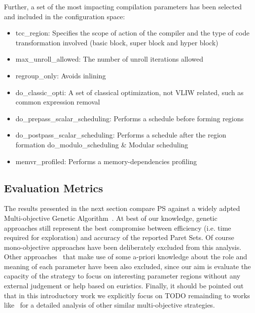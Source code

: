 \begin{itemize}
Further, a set of the most impacting compilation parameters has been
selected and included in the configuration space:
\begin{itemize}
\item{tcc\_region}: Specifies the scope of action of the compiler and the type
of code transformation involved (basic block, super block and hyper
block) 
\item {max\_unroll\_allowed}: The number of unroll iterations allowed
\item{regroup\_only}: Avoids inlining 
\item{do\_classic\_opti}: A set of classical optimization, not VLIW related,
such as common expression removal 
\item{do\_prepass\_scalar\_scheduling}: Performs a schedule before
forming regions 
\item{do\_postpass\_scalar\_scheduling}: Performs a schedule after the region formation 
do\_modulo\_scheduling & Modular scheduling 
\item{memvr\_profiled}: Performs a memory-dependencies profiling 
\end{itemize}

\subsection{Evaluation Metrics}

The results presented in the next section compare PS against a widely
adpted Multi-objective Genetic Algorithm~\cite{}. At best of our
knowledge, genetic approaches
still represent the best compromise between efficiency (i.e. time
required for exploration) and accuracy of the reported Paret Sets. Of
course mono-objective approaches have been
deliberately excluded from this analysis. Other
approaches~\cite{dep} that make use of some a-priori knowledge about the
role and meaning of each parameter have been also excluded, since our
aim is evaluate the capacity of the strategy to focus on interesting
parameter regions without any external judgement or help based on
euristics.  Finally, it should be pointed
out that in this introductory work we explicitly focus on TODO
remainding to works like~\cite{} for a detailed analysis of other
similar multi-objective strategies.


\end{itemize}
